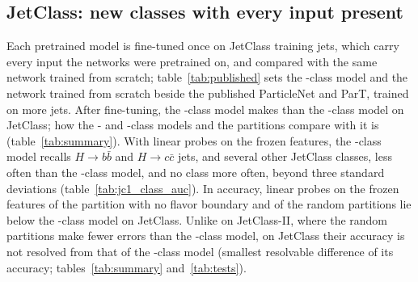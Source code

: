 \subsection{JetClass: new classes with every input present}\label{sec:jetclass}

Each pretrained model is fine-tuned once on \FtSizeESix{} JetClass training jets, which carry every input the
networks were pretrained on, and compared with the same network trained from scratch;
table~\ref{tab:published} sets the \Kfull-class model and the network trained from scratch beside the published
ParticleNet and ParT, trained on more jets. After
fine-tuning, the \Kcoarse-class model makes
 than the \Kfull-class model on JetClass; how the \Kres- and
\Kmid-class models and the partitions compare with it is 
(table~\ref{tab:summary}).
With linear probes on the frozen features, the \Kcoarse-class model recalls $H\to b\bar b$ and $H\to c\bar c$
jets, and several other JetClass classes, less often than the \Kfull-class model, and no class more often, beyond
three standard deviations (table~\ref{tab:jc1_class_auc}). In accuracy, linear probes on the frozen features of the
partition with no flavor boundary and of the random partitions lie below the \Kfull-class model on JetClass. Unlike
on JetClass-II, where the random partitions make fewer errors than the \Kcoarse-class model, on JetClass their
accuracy is not resolved from that of the \Kcoarse-class model (smallest resolvable difference
\MlstPwJcOneRandCoarse{} of its accuracy; tables~\ref{tab:summary} and~\ref{tab:tests}).
